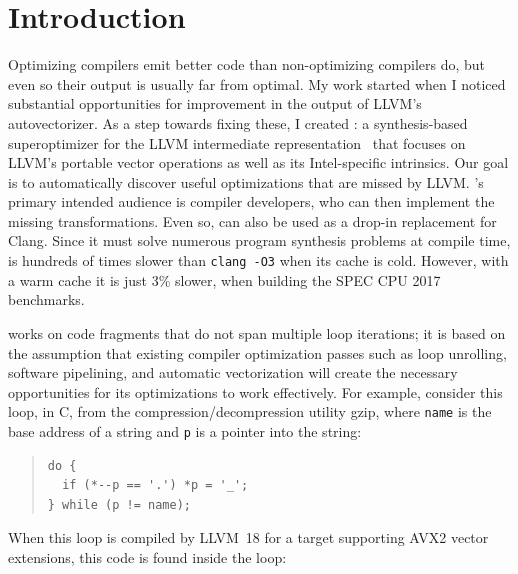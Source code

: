 \section{Introduction}

Optimizing compilers emit better code than non-optimizing compilers
do, but even so their output is usually far from optimal.
%
My work started when I noticed substantial opportunities for
improvement in the output of LLVM's autovectorizer.
%
As a step towards fixing these, I created \minotaur{}: a synthesis-based
superoptimizer for the LLVM intermediate
representation~\cite{llvm} that focuses on LLVM's portable
vector operations as well as its Intel-specific intrinsics.
%
Our goal is to automatically discover useful optimizations that are
missed by LLVM\@.
%
\minotaur's primary intended audience is compiler developers, who can then
implement the missing transformations.
%
Even so, \minotaur{} can also be used as a drop-in replacement for
Clang\@.
%
Since it must solve numerous program synthesis problems at compile
time, \minotaur{} is hundreds of times slower than \texttt{clang -O3}
when its cache is cold.
%
However, with a warm cache it is just 3\% slower, when building the
SPEC CPU 2017 benchmarks.


\minotaur{} works on code fragments that do not span multiple loop
iterations; it is based on the assumption that existing compiler
optimization passes such as loop unrolling, software pipelining, and
automatic vectorization will create the necessary opportunities for
its optimizations to work effectively.
%
For example, consider this loop, in C, from the
compression/decompression utility gzip, where \texttt{name} is the
base address of a string and \texttt{p} is a pointer into the string:

{\begin{quote}
\begin{verbatim}
do {
  if (*--p == '.') *p = '_';
} while (p != name);
\end{verbatim}
\end{quote}}

When this loop is compiled by LLVM~18 for a target supporting AVX2
vector extensions, this code is found inside the loop:

